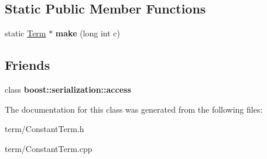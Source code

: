 \subsection*{\-Static \-Public \-Member \-Functions}
\begin{DoxyCompactItemize}
\item 
\hypertarget{classConstantTerm_a2b9c27b793e9dd5a2d97869dfab823cf}{static \hyperlink{classTerm}{\-Term} $\ast$ {\bfseries make} (long int c)}\label{classConstantTerm_a2b9c27b793e9dd5a2d97869dfab823cf}

\end{DoxyCompactItemize}
\subsection*{\-Friends}
\begin{DoxyCompactItemize}
\item 
\hypertarget{classConstantTerm_ac98d07dd8f7b70e16ccb9a01abf56b9c}{class {\bfseries boost\-::serialization\-::access}}\label{classConstantTerm_ac98d07dd8f7b70e16ccb9a01abf56b9c}

\end{DoxyCompactItemize}


\-The documentation for this class was generated from the following files\-:\begin{DoxyCompactItemize}
\item 
term/\-Constant\-Term.\-h\item 
term/\-Constant\-Term.\-cpp\end{DoxyCompactItemize}

